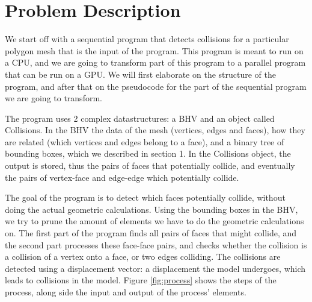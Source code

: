 \section{Problem Description}
We start off with a sequential program that detects collisions for a particular polygon mesh that is the input of the program. This program is meant to run on a CPU, and we are going to transform part of this program to a parallel program that can be run on a GPU. We will first elaborate on the structure of the program, and after that on the pseudocode for the part of the sequential program we are going to transform.

The program uses 2 complex datastructures: a BHV and an object called Collisions. In the BHV the data of the mesh (vertices, edges and faces), how they are related (which vertices and edges belong to a face), and a binary tree of bounding boxes, which we described in section 1. In the Collisions object, the output is stored, thus the pairs of faces that potentially collide, and eventually the pairs of vertex-face and edge-edge which potentially collide.

The goal of the program is to detect which faces potentially collide, without doing the actual geometric calculations. Using the bounding boxes in the BHV, we try to prune the amount of elements we have to do the geometric calculations on. The first part of the program finds all pairs of faces that might collide, and the second part processes these face-face pairs, and checks whether the collision is a collision of a vertex onto a face, or two edges colliding. The collisions are detected using a displacement vector: a displacement the model undergoes, which leads to collisions in the model. Figure \ref{fig:process} shows the steps of the process, along side the input and output of the process' elements.

